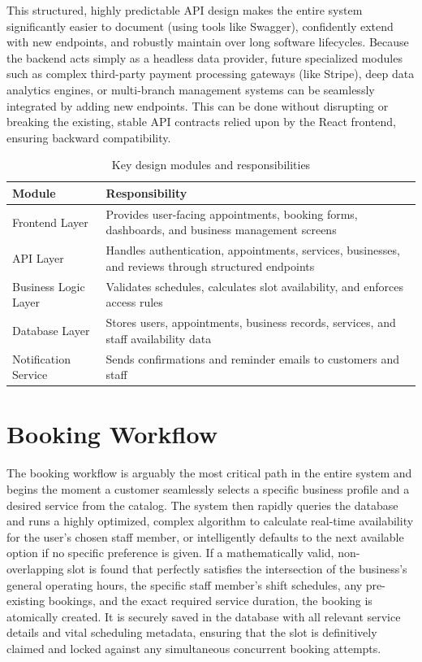 This structured, highly predictable API design makes the entire system significantly easier to document (using tools like Swagger), confidently extend with new endpoints, and robustly maintain over long software lifecycles. Because the backend acts simply as a headless data provider, future specialized modules such as complex third-party payment processing gateways (like Stripe), deep data analytics engines, or multi-branch management systems can be seamlessly integrated by adding new endpoints. This can be done without disrupting or breaking the existing, stable API contracts relied upon by the React frontend, ensuring backward compatibility.

\begin{table}[h]
\centering
\caption{Key design modules and responsibilities}
\begin{tabular}{|p{4cm}|p{8cm}|}
\hline
\textbf{Module} & \textbf{Responsibility} \\
\hline
Frontend Layer & Provides user-facing appointments, booking forms, dashboards, and business management screens \\
\hline
API Layer & Handles authentication, appointments, services, businesses, and reviews through structured endpoints \\
\hline
Business Logic Layer & Validates schedules, calculates slot availability, and enforces access rules \\
\hline
Database Layer & Stores users, appointments, business records, services, and staff availability data \\
\hline
Notification Service & Sends confirmations and reminder emails to customers and staff \\
\hline
\end{tabular}
\end{table}

\section{Booking Workflow}
The booking workflow is arguably the most critical path in the entire system and begins the moment a customer seamlessly selects a specific business profile and a desired service from the catalog. The system then rapidly queries the database and runs a highly optimized, complex algorithm to calculate real-time availability for the user's chosen staff member, or intelligently defaults to the next available option if no specific preference is given. If a mathematically valid, non-overlapping slot is found that perfectly satisfies the intersection of the business's general operating hours, the specific staff member's shift schedules, any pre-existing bookings, and the exact required service duration, the booking is atomically created. It is securely saved in the database with all relevant service details and vital scheduling metadata, ensuring that the slot is definitively claimed and locked against any simultaneous concurrent booking attempts.

